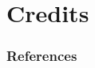 \documentclass[aspectratio=169]{beamer}
\begin{document}

\section{Credits}



\begin{frame}[t, allowframebreaks]
\frametitle{References}


\end{frame}
\end{document}
